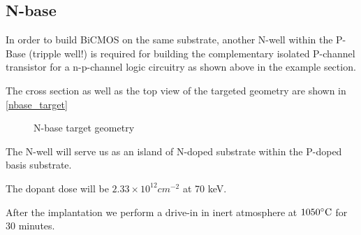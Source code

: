 \subsection{N-base}\label{nbase_chapter}
In order to build BiCMOS on the same substrate, another N-well within the P-Base (tripple well!) is required for building the complementary isolated P-channel transistor for a n-p-channel logic circuitry as shown above in the example section.

The cross section as well as the top view of the targeted geometry are shown in \autoref{nbase_target}

\begin{figure}[H]
	\centering
	\begin{tikzpicture}[node distance = 3cm, auto, thick,scale=\CrossAndTopSectionBig, every node/.style={transform shape}]
		
	\end{tikzpicture}
	\caption{N-base target geometry}
	\label{nbase_target}
\end{figure}

The N-well will serve us as an island of N-doped substrate within the P-doped basis substrate.

The dopant dose will be $2.33\times10^{12}cm^{-2}$ at 70 keV.

After the implantation we perform a drive-in in inert atmosphere at $1050\degreesC$ for 30 minutes.
